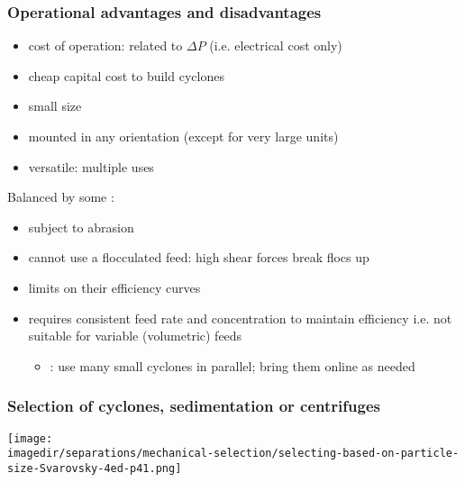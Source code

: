 \begin{frame}\frametitle{Operational advantages and disadvantages}
	{\color{myGreen}{Advantages}}
	\begin{itemize}
		\item	cost of operation: related to $\Delta P$ (i.e. electrical cost only)
		\item	cheap capital cost to build cyclones
		\item	small size
		\item	mounted in any orientation (except for very large units)
		\item	versatile: multiple uses
	\end{itemize}

	Balanced by some {\color{myOrange}{disadvantages}}:
	\begin{itemize}
		\item	subject to abrasion
		\item	cannot use a flocculated feed: high shear forces break flocs up
		\item	limits on their efficiency curves
		\item	requires consistent feed rate and concentration to maintain efficiency i.e. not suitable for variable (volumetric) feeds
		\begin{itemize}
			\item	{\color{myBlue}{counteract}}: use many small cyclones in parallel; bring them online as needed
		\end{itemize}
	\end{itemize}
\end{frame}

\begin{frame}\frametitle{Selection of cyclones, sedimentation or centrifuges}
	\begin{center}
		\texttt{[image: \\imagedir/separations/mechanical-selection/selecting-based-on-particle-size-Svarovsky-4ed-p41.png]}
	\end{center}
\end{frame}

